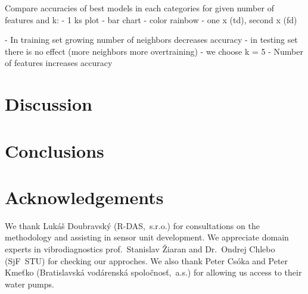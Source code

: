 \documentclass{llncs}
\begin{document}
Compare accuracies of best models in each categories for given number of features and k:
- 1 ks plot - bar chart - color rainbow - one x (td), second x (fd)



- In training set growing number of neighbors decreases accuracy - in testing set there is no effect (more neighbors more overtraining)
	- we choose k = 5
- Number of features increases accuracy


\section{Discussion}

\section{Conclusions}


\section*{Acknowledgements}
We thank Lukáš Doubravský (R-DAS,~s.r.o.) for consultations on the methodology and assisting in sensor unit development. We appreciate domain experts in vibrodiagnostics prof.~Stanislav Žiaran and Dr.~Ondrej Chlebo (SjF~STU) for checking our approches. We also thank Peter Csóka and Peter Kmeťko (Bratislavská vodárenská spoločnosť,~a.s.) for allowing us access to their water pumps.

\printbibliography
\end{document}
